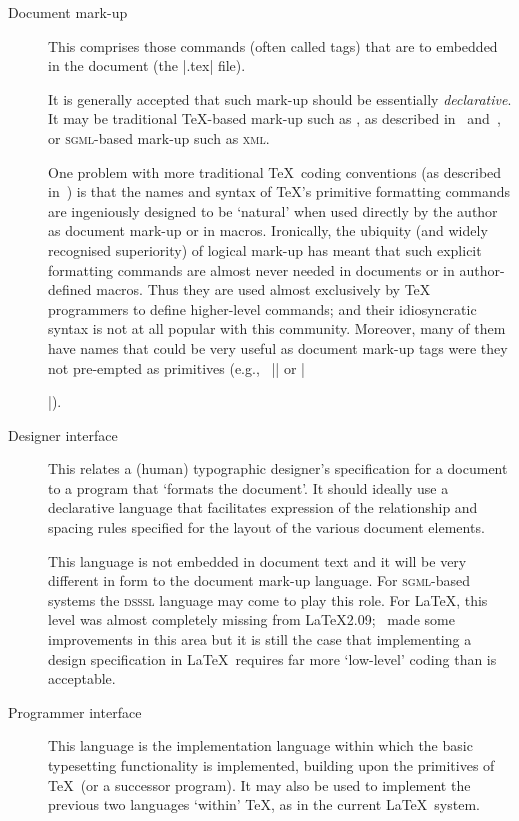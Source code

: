 \documentclass{article}
\providecommand \acro [1]{\textsc{\MakeLowercase{#1}}}
\providecommand \eg {e.g.,~}
\begin{document}
\begin{description}
\item[Document mark-up] This comprises those commands (often called tags)
  that are to embedded in the document (the |.tex| file).

  It is generally accepted that such mark-up should be essentially
  \emph{declarative}.
  It may be traditional \TeX-based mark-up such as
  \LaTeXe, as described in~\cite{A-W:LLa94} and~\cite{A-W:GMS94},
  or \acro{SGML}-based mark-up such as \acro{XML}.
  
  One problem with more traditional \TeX\ coding conventions (as
  described in~\cite{A-W:K-TB}) is that the names and syntax of \TeX's
  primitive formatting commands are ingeniously designed to be
  `natural' when used directly by the author as document mark-up or in
  macros.  Ironically, the ubiquity (and widely recognised
  superiority) of logical mark-up has meant that such explicit
  formatting commands are almost never needed in documents or in
  author-defined macros.  Thus they are used almost exclusively by
  \TeX{} programmers to define higher-level commands; and their
  idiosyncratic syntax is not at all popular with this community.
  Moreover, many of them have names that could be very useful as
  document mark-up tags were they not pre-empted as primitives (\eg
  |\box| or |\special|).
  
\item[Designer interface] This relates a (human) typographic
  designer's specification for a document to a program that `formats
  the document'.  It should ideally use a declarative language that
  facilitates expression of the relationship and spacing rules specified
  for the layout of the various document elements.

  This language is not embedded in document text and it will be very
  different in form to the document mark-up language.  For
  \acro{SGML}-based systems the \acro{DSSSL} language may come to play
  this role.  For \LaTeX, this level was almost completely missing
  from \LaTeX2.09; \LaTeXe\ made some improvements in this area but it
  is still the case that implementing a design specification in
  \LaTeX\ requires far more `low-level' coding than is acceptable.
\item[Programmer interface] 
  This language is the implementation
  language within which the basic typesetting functionality is
  implemented, building upon the primitives of \TeX\ (or a
  successor program).
  It may also be used to implement the previous
  two languages `within' \TeX, as in the current \LaTeX\ system.
\end{description}
\end{document}
